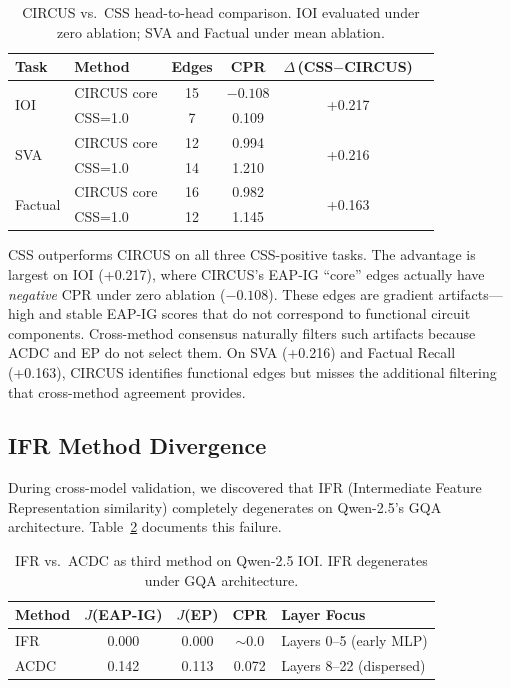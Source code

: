 \documentclass[11pt]{article}
\newcommand{\css}{\textsc{CSS}}
\begin{document}
\begin{table}[t]
\centering
\caption{CIRCUS vs.\ \css{} head-to-head comparison. IOI evaluated under zero ablation; SVA and Factual under mean ablation.}
\label{tab:circus}
\small
\begin{tabular}{llcccc}
\toprule
\textbf{Task} & \textbf{Method} & \textbf{Edges} & \textbf{CPR} & \textbf{$\Delta$\,(CSS$-$CIRCUS)} \\
\midrule
\multirow{2}{*}{IOI} & CIRCUS core & 15 & $-0.108$ & \multirow{2}{*}{+0.217} \\
 & CSS=1.0 & 7 & 0.109 & \\
\midrule
\multirow{2}{*}{SVA} & CIRCUS core & 12 & 0.994 & \multirow{2}{*}{+0.216} \\
 & CSS=1.0 & 14 & 1.210 & \\
\midrule
\multirow{2}{*}{Factual} & CIRCUS core & 16 & 0.982 & \multirow{2}{*}{+0.163} \\
 & CSS=1.0 & 12 & 1.145 & \\
\bottomrule
\end{tabular}
\end{table}

\css{} outperforms CIRCUS on all three CSS-positive tasks. The advantage is largest on IOI (+0.217), where CIRCUS's EAP-IG ``core'' edges actually have \emph{negative} CPR under zero ablation ($-0.108$). These edges are gradient artifacts---high and stable EAP-IG scores that do not correspond to functional circuit components. Cross-method consensus naturally filters such artifacts because ACDC and EP do not select them. On SVA (+0.216) and Factual Recall (+0.163), CIRCUS identifies functional edges but misses the additional filtering that cross-method agreement provides.

\subsection{IFR Method Divergence}
\label{sec:ifr}

During cross-model validation, we discovered that IFR (Intermediate Feature Representation similarity) completely degenerates on Qwen-2.5's GQA architecture. Table~\ref{tab:ifr} documents this failure.

\begin{table}[t]
\centering
\caption{IFR vs.\ ACDC as third method on Qwen-2.5 IOI. IFR degenerates under GQA architecture.}
\label{tab:ifr}
\small
\begin{tabular}{lcccl}
\toprule
\textbf{Method} & \textbf{$J$(EAP-IG)} & \textbf{$J$(EP)} & \textbf{CPR} & \textbf{Layer Focus} \\
\midrule
IFR & 0.000 & 0.000 & $\sim$0.0 & Layers 0--5 (early MLP) \\
ACDC & 0.142 & 0.113 & 0.072 & Layers 8--22 (dispersed) \\
\bottomrule
\end{tabular}
\end{table}
\end{document}
